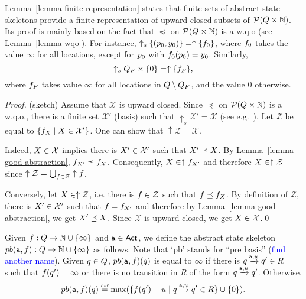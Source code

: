 \documentclass[envcountsame,a4paper,12pt]{llncs}
\begin{document}
  Lemma~\ref{lemma-finite-representation} states that finite sets of abstract state skeletons
  provide a finite representation of
  upward closed subsets of ${\cal P}(Q \times \mathbb{N})$. 
  Its proof is mainly based on the fact that $\preceq$ on ${\cal P}(Q \times \mathbb{N})$
  is a w.q.o (see Lemma~\ref{lemma-wqo}).
  For instance, $\uparrow_s \{ (p_0,y_0) \} = \uparrow \{ f_0 \}$,
  where $f_0$ takes the value $\infty$ for all locations, except for $p_0$
  with $f_0(p_0) = y_0$. Similarly,
  $$
  \uparrow_{s} Q_F \times \{ 0 \} = \uparrow \{ f_F \},
  $$
  where $f_F$ takes value $\infty$ for all locations in $Q \setminus Q_F$,
  and the value $0$ otherwise.

  \begin{proof} (sketch)
  Assume that $\mathcal{X}$ is upward closed.
  Since $\preceq$ on ${\cal P}(Q \times \mathbb{N})$
  is a w.q.o., there is a finite set $\mathcal{X}'$ (basis) such that
  $\uparrow_s \mathcal{X}' = \mathcal{X}$ (see e.g.~\cite[Theorem 2.3]{Finkel&Schnoebelen01}).
  Let $\mathcal{Z}$ be equal to $\{ f_{X} \mid X \in \mathcal{X}' \}$.
  One can show that $\uparrow \mathcal{Z} = \mathcal{X}$.

  Indeed, $X \in \mathcal{X}$ implies there is $X' \in \mathcal{X'}$ such that
  $X' \preceq X$. By Lemma~\ref{lemma-good-abstraction},
  $f_{X'} \preceq f_{X}$. Consequently,
  $X \in \uparrow f_{X'}$ and therefore $X \in \uparrow \mathcal{Z}$
  since $\uparrow \mathcal{Z} = \bigcup_{f \in \mathcal{Z}} \uparrow f$.

  Conversely, let $X \in \uparrow \mathcal{Z}$, i.e. there is $f \in \mathcal{Z}$
  such that $f \preceq f_{X}$. By definition of $\mathcal{Z}$, there is $X'
  \in \mathcal{X'}$ such that $f = f_{X'}$ and therefore by
  Lemma~\ref{lemma-good-abstraction}, we get $X' \preceq X$.
  Since $\mathcal{X}$ is upward closed, we get $X \in \mathcal{X}$.\qed
  \end{proof}

  

  Given $f: Q \to \mathbb{N} \cup \{ \infty \}$ and
  $\mathtt{a} \in {\rm \sf Act}$, we define the abstract state skeleton
  $pb(\mathtt{a}, f):  Q \to \mathbb{N} \cup \{ \infty \}$ as follows.
  Note that `pb' stands for ``pre basis'' (\textcolor{blue}{find another name}). 
  Given $q \in Q$,
  $pb(\mathtt{a}, f)(q)$ is equal to $\infty$ if
  there is $q \xrightarrow{\!\!\mathtt{a},u\!\!} q' \in R$ such that
  $f(q') = \infty$ or there is no transition in $R$ of the form
  $q \xrightarrow{\!\!\mathtt{a},u\!\!} q'$.
  Otherwise,
  $$
  pb(\aaction, \amap)(\alocation)
  \egdef
  \max
  (\set{ \amap(\alocation') - u \mid \alocation \step{\aaction,u} \alocation' \in R} \cup \set{0}). 
  $$
\end{document}
